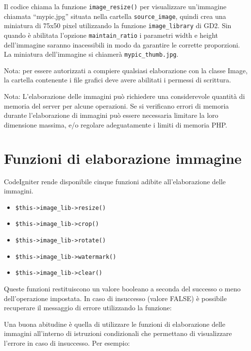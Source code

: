 Il codice chiama la funzione \verb|image_resize()| per visualizzare un'immagine chiamata ``mypic.jpg'' situata nella cartella \verb|source_image|, quindi crea una miniatura di 75x50 pixel utilizzando la funzione \verb|image_library| di GD2. Sin quando è abilitata l'opzione \verb|maintain_ratio| i parametri width e height dell'immagine saranno inacessibili in modo da garantire le corrette proporzioni. La miniatura dell'immagine si chiamerà \verb|mypic_thumb.jpg|.

Nota: per essere autorizzati a compiere qualsiasi elaborazione con la classe Image, la cartella contenente i file grafici deve avere abilitati i permessi di scrittura.

Nota: L'elaborazione delle immagini può richiedere una considerevole quantità di memoria del server per alcune operazioni. Se si verificano errori di memoria durante l'elaborazione di immagini può essere necessaria limitare la loro dimensione massima, e/o regolare adeguatamente i limiti di memoria \ac{PHP}.

\section*{Funzioni di elaborazione immagine}
CodeIgniter rende disponibile cinque funzioni adibite all'elaborazione delle immagini.

\begin{itemize}
\item \verb|$this->image_lib->resize()|

\item \verb|$this->image_lib->crop()|

\item \verb|$this->image_lib->rotate()|

\item \verb|$this->image_lib->watermark()|

\item \verb|$this->image_lib->clear()|
\end{itemize}

Queste funzioni restituiscono un valore booleano a seconda del successo o meno dell'operazione impostata. In caso di insuccesso (valore FALSE) è possibile recuperare il messaggio di errore utilizzando la funzione:


Una buona abitudine è quella di utilizzare le funzioni di elaborazione delle immagini all'interno di istruzioni condizionali che permettano di visualizzare l'errore in caso di insuccesso. Per esempio:


